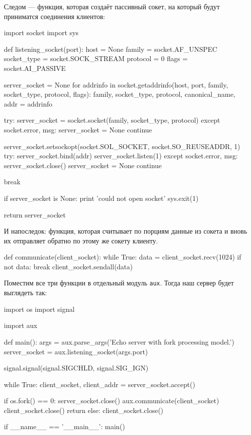Следом — функция, которая создаёт пассивный сокет, на который будут приниматся соединения клиентов:
\begin{pylst}{}{}
import socket
import sys

def listening_socket(port):
    host = None
    family = socket.AF_UNSPEC
    socket_type = socket.SOCK_STREAM
    protocol = 0
    flags = socket.AI_PASSIVE

    server_socket = None
    for addrinfo in socket.getaddrinfo(host, port, family, socket_type,
                                       protocol, flags):
        family, socket_type, protocol, canonical_name, addr = addrinfo

        try:
            server_socket = socket.socket(family, socket_type, protocol)
        except socket.error, msg:
            server_socket = None
            continue

        server_socket.setsockopt(socket.SOL_SOCKET, socket.SO_REUSEADDR, 1)
        try:
            server_socket.bind(addr)
            server_socket.listen(1)
        except socket.error, msg:
            server_socket.close()
            server_socket = None
            continue

        break

    if server_socket is None:
        print 'could not open socket'
        sys.exit(1)

    return server_socket
\end{pylst}

И напоследок: функция, которая считывает по порциям данные из сокета и вновь их отправляет обратно по этому же сокету клиенту.
\begin{pylst}{}{}
def communicate(client_socket):
    while True:
        data = client_socket.recv(1024)
        if not data:
            break
        client_socket.sendall(data)
\end{pylst}

Поместим все три функции в отдельный модуль \lstinline{aux}. Тогда наш сервер будет выглядеть так:
\begin{pylst}{}{}
import os
import signal

import aux

def main():
    args = aux.parse_args('Echo server with fork processing model.')
    server_socket = aux.listening_socket(args.port)

    signal.signal(signal.SIGCHLD, signal.SIG_IGN)

    while True:
        client_socket, client_addr = server_socket.accept()

        if os.fork() == 0:
            server_socket.close()
            aux.communicate(client_socket)
            client_socket.close()
            return
        else:
            client_socket.close()

if __name__ == '__main__':
    main()
\end{pylst}

